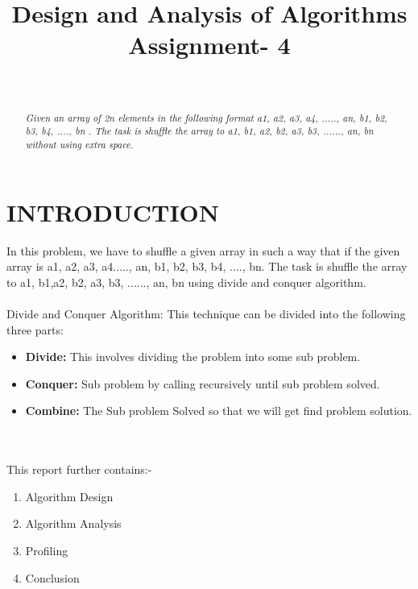 \documentclass[conference]{IEEEtran}
\begin{document}
\title{\LARGE Design and Analysis of Algorithms Assignment- 4
}


 \author{
 }
 
 \author{ 
\\
}

\maketitle

\begin{abstract}
\textit{ Given an array of 2n elements in the following format { a1, a2, a3, a4,
....., an, b1, b2, b3, b4, ...., bn }. The task is shuffle the array to {a1, b1,
a2, b2, a3, b3, ......, an, bn } without using extra space.}
\end{abstract}

\IEEEoverridecommandlockouts


\IEEEpeerreviewmaketitle


\section{\textbf{ INTRODUCTION}}
In this problem, we have to shuffle a given array in such a way that if the given array is a1, a2, a3, a4....., an, b1, b2, b3, b4, ...., bn. The task is shuffle the array to {a1, b1,a2, b2, a3, b3, ......, an, bn }using divide and conquer algorithm.\\\\
Divide and Conquer Algorithm:
This technique can be divided into the following three parts:
\begin{itemize}
  \item \textbf{Divide:} This involves dividing the problem into some sub problem.
  \item \textbf{Conquer:} Sub problem by calling recursively until sub problem solved.
  \item \textbf{Combine:} The Sub problem Solved so that we will get find problem solution.
\end{itemize}\\\\
This report further contains:-
\begin{enumerate}
  \item Algorithm Design
  \item Algorithm Analysis
  \item Profiling
  \item Conclusion
\end{enumerate}
\end{document}
